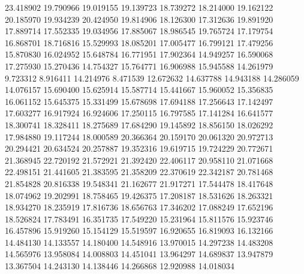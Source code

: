 23.418902
19.790966
19.019155
19.139723
18.739272
18.214000
19.162122
20.185970
19.934239
20.424950
19.814906
18.126300
17.312636
19.891920
17.889714
17.552335
19.034956
17.885067
18.986545
19.765724
17.179754
16.868701
18.716816
15.529993
18.085201
17.005477
16.799121
17.479256
15.870830
16.024952
15.648784
16.771951
17.902364
14.949257
16.590068
17.275930
15.270436
14.754327
15.764771
16.906988
15.945588
14.261979
9.723312
8.916411
14.214976
8.471539
12.672632
14.637788
14.943188
14.286059
14.076157
15.690400
15.625914
15.587714
15.441667
15.960052
15.356835
16.061152
15.645375
15.331499
15.678698
17.694188
17.256643
17.142497
17.603277
16.917924
16.924606
17.250115
16.797585
17.141284
16.641577
18.300741
18.328411
18.275689
17.684290
19.145892
18.856150
18.026292
17.984880
19.117244
18.000589
20.366364
20.159170
20.061320
20.972713
20.294421
20.634524
20.257887
19.352316
19.619715
19.724229
20.772671
21.368945
22.720192
21.572921
21.392420
22.406117
20.958110
21.071668
22.498151
21.441605
21.383595
21.358209
22.370619
22.342187
20.781468
21.854828
20.816338
19.548341
21.162677
21.917271
17.544478
18.417648
18.074962
19.202991
18.758465
19.426375
17.208187
18.531626
18.263321
18.934270
18.235919
17.816736
18.656763
17.346202
17.088249
17.652196
18.526824
17.783491
16.351735
17.549220
15.231964
15.811576
15.923746
16.457896
15.919260
15.154129
15.519597
16.920655
16.819093
16.132166
14.484130
14.133557
14.180400
14.548916
13.970015
14.297238
14.483208
14.565976
13.958084
14.008803
14.451041
13.964297
14.689837
13.947879
13.367504
14.243130
14.138446
14.266868
12.920988
14.018034
